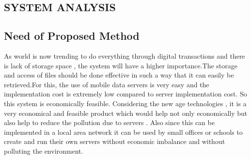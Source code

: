 \documentclass[12pt, a4paper]{article}
\begin{document}
\newpage
\begin{center}
\section{SYSTEM ANALYSIS}\vspace{5mm}
\end{center}
\subsection{Need of Proposed Method}
As world is now trending to do everything through  digital transactions and there is lack of storage space , the system will have a higher importance.The storage and access of files should be done effective in such a way that it can easily be retrieved.For this, the use of mobile data servers is very easy and  the implementation cost is extremely low compared to server implementation cost. So this system is economically feasible. Considering the new age technologies , it is a very economical and feasible product which would help not only economically but also help to reduce the pollution due to servers  .  Also since this can be implemented in a local area network it can be used by small offices or schools to create and run their own servers without economic imbalance and without polluting the environment.
\end{document}
